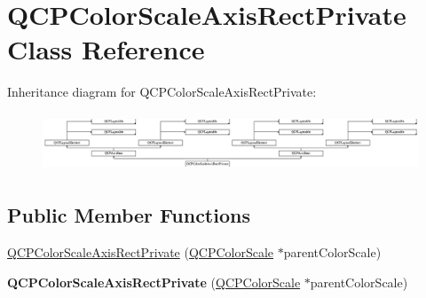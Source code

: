 \hypertarget{class_q_c_p_color_scale_axis_rect_private}{}\section{Q\+C\+P\+Color\+Scale\+Axis\+Rect\+Private Class Reference}
\label{class_q_c_p_color_scale_axis_rect_private}
Inheritance diagram for Q\+C\+P\+Color\+Scale\+Axis\+Rect\+Private\+:\begin{figure}[H]
\begin{center}
\leavevmode
\includegraphics[height=1.758794cm]{class_q_c_p_color_scale_axis_rect_private}
\end{center}
\end{figure}
\subsection*{Public Member Functions}
\begin{DoxyCompactItemize}
\item 
\hyperlink{class_q_c_p_color_scale_axis_rect_private_ad3b242f75dd2b33581364a4e668a80db}{Q\+C\+P\+Color\+Scale\+Axis\+Rect\+Private} (\hyperlink{class_q_c_p_color_scale}{Q\+C\+P\+Color\+Scale} $\ast$parent\+Color\+Scale)
\item 
\mbox{\label{class_q_c_p_color_scale_axis_rect_private_ad3b242f75dd2b33581364a4e668a80db}} 
{\bfseries Q\+C\+P\+Color\+Scale\+Axis\+Rect\+Private} (\hyperlink{class_q_c_p_color_scale}{Q\+C\+P\+Color\+Scale} $\ast$parent\+Color\+Scale)
\end{DoxyCompactItemize}
